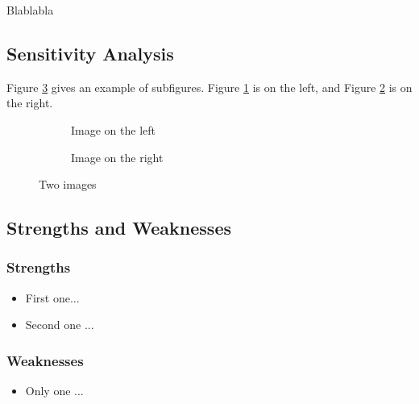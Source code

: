 \documentclass[12pt]{article}
\begin{document}
		Blablabla
	
	
	
	\subsection{Sensitivity Analysis}
			
		Figure \ref{fig:subfigures} gives an example of subfigures. Figure \ref{subfig:left} is on the left, and Figure \ref{subfig:right} is on the right.
		
		\begin{figure}[htbp]
			\centering
			\begin{subfigure}[b]{.4\textwidth}
				\caption{Image on the left}\label{subfig:left}
			\end{subfigure}
			\begin{subfigure}[b]{.4\textwidth}
				\caption{Image on the right}\label{subfig:right}
			\end{subfigure}
			\caption{Two images}\label{fig:subfigures}
		\end{figure}
	
	
	
	\subsection{Strengths and Weaknesses}

		\subsubsection{Strengths}
		
			\begin{itemize}
			    \item First one...
			    \item Second one ...
			\end{itemize}
		
		
		
		\subsubsection{Weaknesses}
		
			\begin{itemize}
			    \item Only one ...
			 \end{itemize}
\end{document}
